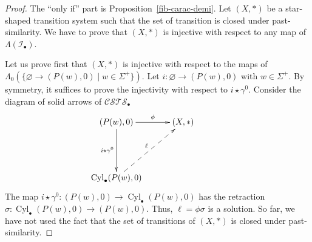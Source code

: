 \documentclass[a4paper,12pt]{amsart}
\begin{document}
\begin{proof} The ``only if'' part is Proposition~\ref{fib-carac-demi}. Let
$(X,*)$ be a star-shaped transition system such that the set of
transition is closed under past-similarity.  We have to prove that
$(X,*)$ is injective with respect to any map of $\Lambda({\mathcal{I}}_\bullet)$.

Let us prove first that $(X,*)$ is injective with respect to the maps
of $\Lambda_0(\{\varnothing \to (P(w),0)\mid w \in \Sigma^+\})$.  Let
$i:\varnothing \to (P(w),0)$ with $w \in \Sigma^+$. By symmetry, it
suffices to prove the injectivity with respect to $i\star
\gamma^0$. Consider the diagram of solid arrows of ${\mathcal{C\!S\!T\!S}}_\bullet$
\[
\xymatrix@C=3em@R=5em {
  (P(w),0) {\ar@{->}[r]^-{{\phi}}} {\ar@{->}[d]_-{{i\star \gamma^0}}} & (X,*) \\
  \operatorname{{Cyl}}_\bullet(P(w),0) \ar@{-->}[ru]^-{\ell} && }
\]
The map $i\star \gamma^0:(P(w),0) \to \operatorname{{Cyl}}_\bullet(P(w),0)$ has the
retraction $\sigma:\operatorname{{Cyl}}_\bullet(P(w),0) \to (P(w),0)$. Thus,
$\ell=\phi\sigma$ is a solution. So far, we have not used the fact
that the set of transitions of $(X,*)$ is closed under
past-similarity.


\end{proof}
\end{document}
